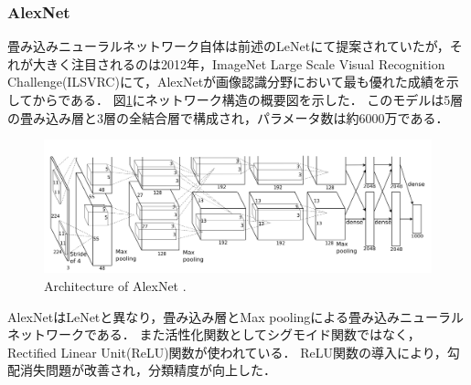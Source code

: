 \subsubsection{AlexNet}
    畳み込みニューラルネットワーク自体は前述のLeNetにて提案されていたが，それが大きく注目されるのは2012年，ImageNet Large Scale Visual Recognition Challenge(ILSVRC)\cite{ILSVRC15}にて，AlexNet\cite{krizhevsky2012imagenet}が画像認識分野において最も優れた成績を示してからである．
    図\ref{fig:alexnet}にネットワーク構造の概要図を示した．
    このモデルは5層の畳み込み層と3層の全結合層で構成され，パラメータ数は約6000万である．
    \begin{figure}[ht]
      \centering
      \includegraphics[width=14cm]{8_appendix/img/alexnet.png}
      \caption{Architecture of AlexNet \cite{krizhevsky2012imagenet}.}
      \label{fig:alexnet}
    \end{figure}
    AlexNetはLeNetと異なり，畳み込み層とMax poolingによる畳み込みニューラルネットワークである．
    また活性化関数としてシグモイド関数ではなく，Rectified Linear Unit(ReLU)関数\cite{nair2010rectified}が使われている．
    ReLU関数の導入により，勾配消失問題が改善され，分類精度が向上した．


